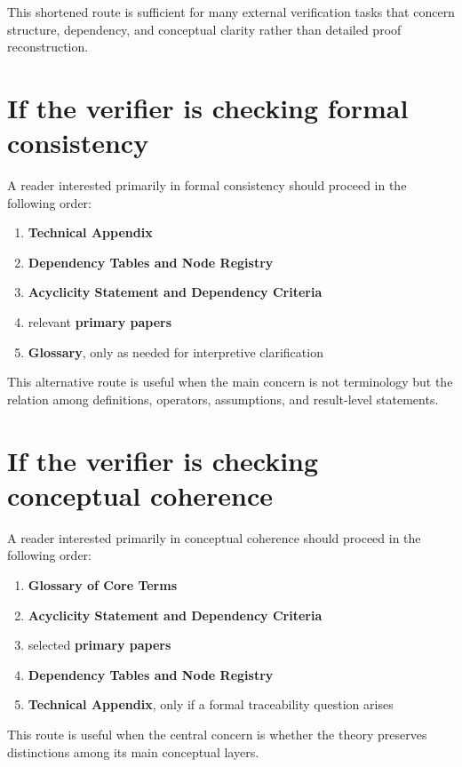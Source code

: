 \documentclass[11pt,a4paper]{article}
\begin{document}
This shortened route is sufficient for many external verification tasks that concern structure,
dependency, and conceptual clarity rather than detailed proof reconstruction.

\section{If the verifier is checking formal consistency}

A reader interested primarily in formal consistency should proceed in the following order:

\begin{enumerate}[leftmargin=2em]
	\item \textbf{Technical Appendix}
	\item \textbf{Dependency Tables and Node Registry}
	\item \textbf{Acyclicity Statement and Dependency Criteria}
	\item relevant \textbf{primary papers}
	\item \textbf{Glossary}, only as needed for interpretive clarification
\end{enumerate}

This alternative route is useful when the main concern is not terminology but the relation among
definitions, operators, assumptions, and result-level statements.

\section{If the verifier is checking conceptual coherence}

A reader interested primarily in conceptual coherence should proceed in the following order:

\begin{enumerate}[leftmargin=2em]
	\item \textbf{Glossary of Core Terms}
	\item \textbf{Acyclicity Statement and Dependency Criteria}
	\item selected \textbf{primary papers}
	\item \textbf{Dependency Tables and Node Registry}
	\item \textbf{Technical Appendix}, only if a formal traceability question arises
\end{enumerate}

This route is useful when the central concern is whether the theory preserves distinctions among
its main conceptual layers.
\end{document}
